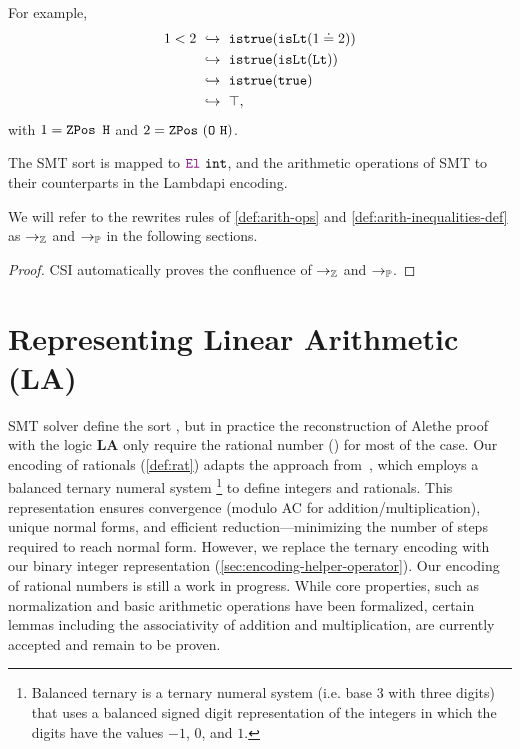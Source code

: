 \begin{example}
For example,
\begin{align*}
  1 < 2
  &\ \hookrightarrow\ \texttt{istrue}(\texttt{isLt}(1 \doteq 2)) \\
  &\ \hookrightarrow\ \texttt{istrue}(\texttt{isLt}(\texttt{Lt})) \\
  &\ \hookrightarrow\ \texttt{istrue}(\texttt{true}) \\
  &\ \hookrightarrow\ \top,
\end{align*}
with $1 = \mathop{\texttt{ZPos}}~\texttt{H}$ and $2 = \mathop{\texttt{ZPos}}~(\texttt{O}~\texttt{H})$.
\end{example}

The SMT sort  is mapped to $\el~\texttt{int}$, and the arithmetic operations of SMT to their counterparts in the Lambdapi encoding.

\begin{notation}
We will refer to the rewrites rules of \cref{def:arith-ops} and \cref{def:arith-inequalities-def} as $\rightarrow_{\mathbb{Z}}$ and $\rightarrow_\mathbb{P}$ in the following sections.
\end{notation}

\begin{lemma}
\begin{proof}
CSI \cite{CSI} automatically proves the confluence of $\rightarrow_\mathbb{Z}$ and $\rightarrow_\mathbb{P}$.
\end{proof}
\label{lemma:confluenceZP}
\end{lemma}

\section{Representing Linear Arithmetic (\uppercase{\textbf{LA})}}
\label{ssec:encoding-la}

SMT solver define the sort , but in practice the reconstruction of Alethe proof with the logic \textbf{LA} only require the rational number (\Q) for most of the case.
Our encoding of rationals (\cref{def:rat}) adapts the approach from~\cite{frac-rw}, which employs a balanced ternary numeral system
\footnote{Balanced ternary is a ternary numeral system (i.e. base $3$ with three digits) that uses a balanced signed digit representation of the integers in which the digits have the values $-1$, $0$, and $1$.}
to define integers and rationals.
This representation ensures convergence (modulo AC for addition/multiplication), unique normal forms, and efficient reduction—minimizing the number of steps required to reach normal form.
However, we replace the ternary encoding with our binary integer representation (\cref{sec:encoding-helper-operator}).
Our encoding of rational numbers is still a work in progress.
While core properties, such as normalization and basic arithmetic operations have been formalized, certain lemmas including the associativity of addition and multiplication, are currently accepted and remain to be proven.

